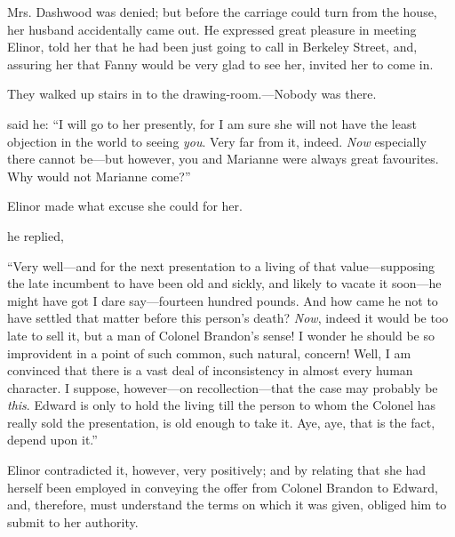 Mrs. Dashwood was denied; but before the carriage could turn from the house, her husband accidentally came out. He expressed great pleasure in meeting Elinor, told her that he had been just going to call in Berkeley Street, and, assuring her that Fanny would be very glad to see her, invited her to come in.

They walked up stairs in to the drawing-room.---Nobody was there.

 said he: “I will go to her presently, for I am sure she will not have the least objection in the world to seeing {\em you}. Very far from it, indeed. {\em Now} especially there cannot be---but however, you and Marianne were always great favourites. Why would not Marianne come?”

Elinor made what excuse she could for her.

 he replied, 




“Very well---and for the next presentation to a living of that value---supposing the late incumbent to have been old and sickly, and likely to vacate it soon---he might have got I dare say---fourteen hundred pounds. And how came he not to have settled that matter before this person's death? {\em Now}, indeed it would be too late to sell it, but a man of Colonel Brandon's sense! I wonder he should be so improvident in a point of such common, such natural, concern! Well, I am convinced that there is a vast deal of inconsistency in almost every human character. I suppose, however---on recollection---that the case may probably be {\em this}. Edward is only to hold the living till the person to whom the Colonel has really sold the presentation, is old enough to take it. Aye, aye, that is the fact, depend upon it.”

Elinor contradicted it, however, very positively; and by relating that she had herself been employed in conveying the offer from Colonel Brandon to Edward, and, therefore, must understand the terms on which it was given, obliged him to submit to her authority.


